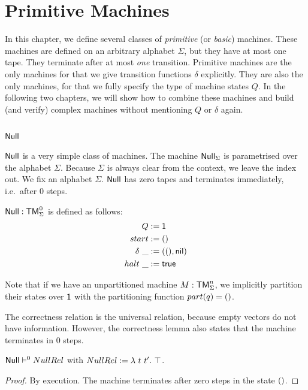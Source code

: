 \chapter{Primitive Machines}
\label{chap:basic}

In this chapter, we define several classes of \textit{primitive} (or \textit{basic}) machines.  These machines are defined on an arbitrary alphabet
$\Sigma$, but they have at most one tape.  They terminate after at most \textit{one} transition.  Primitive machines are the only machines for that we
give transition functions $\delta$ explicitly.  They are also the only machines, for that we fully specify the type of machine states $Q$.  In the
following two chapters, we will show how to combine these machines and build (and verify) complex machines without mentioning $Q$ or $\delta$ again.


\section{$\MS{Null}$}
\label{sec:Null}



$\MS{Null}$ is a very simple class of machines.  The machine $\mathsf{Null}_\Sigma$ is parametrised over the alphabet $\Sigma$.  Because $\Sigma$ is
always clear from the context, we leave the index out.  We fix an alphabet $\Sigma$.  $\MS{Null}$ has zero tapes and terminates immediately, i.e.\
after $0$ steps.

\begin{definition}[$\MS{Null}$][Null]
  \label{def:Null}
  $\MS{Null} : \TM_\Sigma^{\mkern+1mu 0}$ is defined as follows:
  \begin{align*}
    Q          &:= \mathsf{1} \\
    start      &:= \mathsf{()} \\
    \delta ~\_ &:= (\mathsf{()}, \mathsf{nil}) \\
    halt   ~\_ &:= \mathsf{true}
  \end{align*}
\end{definition}
Note that if we have an unpartitioned machine $M:\mathsf{TM}_\Sigma^n$, we implicitly partition their states over $\mathsf{1}$ with the partitioning function
$part(q)=\mathsf{()}$.

The correctness relation is the universal relation, because empty vectors do not have information.  However, the correctness lemma also states that
the machine terminates in $0$ steps.
\begin{lemma}
  \label{lem:Null_Sem} $\mathsf{Null} \mathrel{\vDash^{0}} NullRel$ with $NullRel := \lambda~t~t'.~ \top$.
\end{lemma}
\begin{proof}
  By execution.  The machine terminates after zero steps in the state $\mathsf{()}$.
\end{proof}

